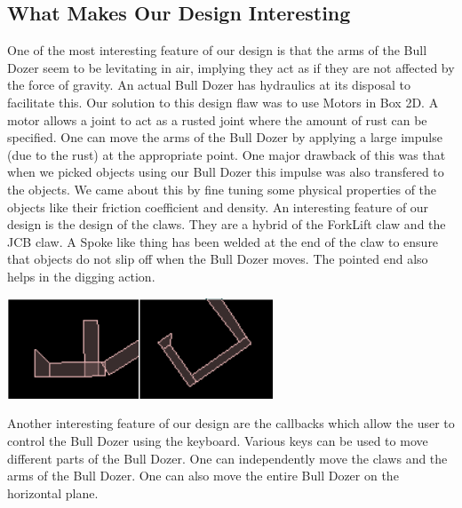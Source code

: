 \documentclass[11pt]{article}
\begin{document}
	\subsection{What Makes Our Design Interesting}
	One of the most interesting feature of our design is that the arms of the Bull Dozer seem to be levitating in air, implying they act as if they are not affected by the force of gravity. An actual Bull Dozer has hydraulics at its disposal to facilitate this.
 Our solution to this design flaw was to use Motors in Box 2D. A motor allows a joint to act as a rusted joint where the amount of rust can be specified. One can move the arms of the Bull Dozer by applying a large impulse (due to the rust) at the appropriate point. One major drawback of this was that when we picked objects using our Bull Dozer this impulse was also transfered to the objects. We came about this by fine tuning some physical properties of the objects like their friction coefficient and density.\newline
	An interesting feature of our design is the design of the claws. They are a hybrid of the ForkLift claw and the JCB claw. A Spoke like thing has been welded at the end of the claw to ensure that objects do not slip off when the Bull Dozer moves. The pointed end also helps in the digging action.\newline
	\begin{center}\includegraphics[height=3cm]{Left_Claw1.png}\includegraphics[height=3cm]{Right_Claw.png}\end{center}	
	Another interesting feature of our design are the callbacks which allow the user to control the Bull Dozer using the keyboard.
Various keys can be used to move different parts of the Bull Dozer. One can independently move the claws and the arms of the Bull Dozer. One can also move the entire Bull Dozer on the horizontal plane.
\end{document}
